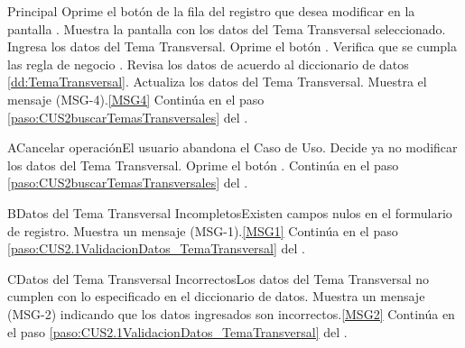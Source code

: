 	\begin{UCtrayectoria}{Principal}			
			\UCpaso[\UCactor] Oprime el botón  de la fila del registro que desea modificar en la pantalla .	
			\UCpaso Muestra la pantalla  con los datos del Tema Transversal seleccionado.
                        \UCpaso [\UCactor] Ingresa los datos del Tema Transversal.\label{paso:CUS2.2ingresaDatosTemaTransversal}
			\UCpaso [\UCactor] Oprime el botón .
			\UCpaso Verifica que se cumpla las regla de negocio .  
			\UCpaso Revisa los datos de acuerdo al diccionario de datos \ref{dd:TemaTransversal}. 
			\UCpaso Actualiza los datos del Tema Transversal.
			\UCpaso Muestra el mensaje (MSG-4).\ref{MSG4}
			\UCpaso Continúa en el paso \ref{paso:CUS2buscarTemasTransversales} del .
	\end{UCtrayectoria}

		\begin{UCtrayectoriaA}{A}{Cancelar operación}{El usuario abandona el Caso de Uso.}
			\UCpaso[\UCactor] Decide ya no modificar los datos del Tema Transversal.
			\UCpaso[\UCactor] Oprime el botón .
			\UCpaso Continúa en el paso \ref{paso:CUS2buscarTemasTransversales} del .
		\end{UCtrayectoriaA}

	\begin{UCtrayectoriaA}{B}{Datos del Tema Transversal Incompletos}{Existen campos nulos en el formulario de registro.}
			\UCpaso Muestra un mensaje (MSG-1).\ref{MSG1}
			\UCpaso Continúa en el paso \ref{paso:CUS2.1ValidacionDatos_TemaTransversal} del .
	\end{UCtrayectoriaA}

	\begin{UCtrayectoriaA}{C}{Datos del Tema Transversal Incorrectos}{Los datos del Tema Transversal no cumplen con lo especificado en el diccionario de datos.}
			\UCpaso Muestra un mensaje (MSG-2) indicando que los datos ingresados son incorrectos.\ref{MSG2}
			\UCpaso Continúa en el paso \ref{paso:CUS2.1ValidacionDatos_TemaTransversal} del .
	\end{UCtrayectoriaA}


